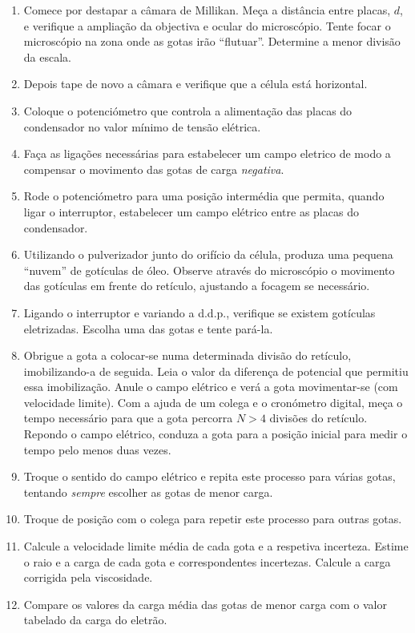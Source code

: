 \documentclass[a4paper,twoside,12pt]{article}      %
\begin{document}
\begin{enumerate}
    \item   Comece por destapar a câmara de Millikan. Meça a distância entre placas,  $d$, 
        e verifique a ampliação da objectiva e ocular do microscópio. Tente focar o microscópio na zona onde as 
        gotas irão ``flutuar''. Determine a menor divisão da escala.
    \item Depois tape de novo a  câmara e verifique que a célula está horizontal.

    \item Coloque o potenciómetro que controla a alimentação das placas do condensador no valor mínimo de tensão elétrica. 

    \item Faça as ligações necessárias para estabelecer um campo eletrico de modo a compensar o movimento das gotas de 
        carga \emph{negativa}.
    \item Rode o potenciómetro para uma posição intermédia que permita, quando ligar o interruptor, 
        estabelecer um campo elétrico entre as placas do condensador. 

    \item     Utilizando o pulverizador junto do orifício da célula, produza uma pequena ``nuvem'' 
        de gotículas de óleo. Observe através do microscópio o movimento das gotículas em 
        frente do retículo, ajustando a focagem se necessário.

    \item  Ligando o interruptor e variando a d.d.p., verifique se existem gotículas eletrizadas. Escolha uma das gotas e tente pará-la.

    \item Obrigue a gota a colocar-se numa determinada divisão do retículo, imobilizando-a de seguida. 
        Leia o valor da diferença de potencial que permitiu essa imobilização. Anule o 
        campo elétrico  e verá a gota movimentar-se (com velocidade limite). Com a ajuda de um colega e o 
        cronómetro digital, meça o tempo necessário para que a gota percorra  $N>4$ divisões
        do retículo. Repondo o campo elétrico, conduza a gota para a posição inicial para  medir o tempo pelo menos duas vezes. 

    \item Troque o sentido do campo elétrico e   repita este processo para várias gotas, tentando \emph{sempre} escolher  as gotas de menor carga.

    \item Troque de posição com o colega para repetir este processo para outras  gotas.

    \item   Calcule a velocidade limite média de cada gota e a respetiva incerteza. Estime o raio e 
        a carga de cada gota e correspondentes incertezas. Calcule a carga corrigida pela viscosidade.

    \item   Compare os valores da carga média das gotas de menor carga  com o valor tabelado da carga do eletrão. 
\end{enumerate}



\end{document}

